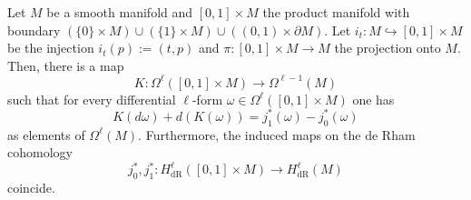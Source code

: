 \begin{theorem}
  Let $M$ be a smooth manifold and $[0,1]\times M$ the product manifold with boundary $(\{0\}\times M) \cup (\{1\}\times M) \cup ((0,1)\times\partial M)$.
  Let $i_t : M \hookrightarrow [0,1]\times M$ be the injection $i_t(p) := (t,p)$ and $\pi : [0,1]\times M \to M$ the projection onto $M$.
  Then, there is a map
  \begin{equation}
    K : \Omega^\ell([0,1]\times M)\to \Omega^{\ell-1}(M)
  \end{equation}
  such that for every differential $\ell$-form $\omega\in\Omega^\ell([0,1]\times M)$ one has
  \begin{equation}
    K(d\omega) + d(K(\omega)) = j^*_1(\omega) - j^*_0(\omega)
  \end{equation}
  as elements of $\Omega^\ell(M)$.
  Furthermore, the induced maps on the de Rham cohomology
  \begin{equation}
    j_0^*, j_1^* : H_{\mathrm{dR}}^\ell([0,1]\times M) \to H_{\mathrm{dR}}^\ell(M)
  \end{equation}
  coincide.
\end{theorem}
